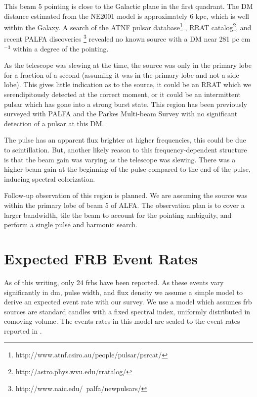 \documentclass[a4paper,fleqn,usenatbib]{mnras}
\begin{document}
This beam 5 pointing is close to the Galactic plane in the first quadrant. The
DM distance estimated from the NE2001 model \citep{2002astro.ph..7156C} is
approximately 6 kpc, which is well within the Galaxy. A search of the ATNF
pulsar database\footnote{http://www.atnf.csiro.au/people/pulsar/psrcat/}
\citep{2005AJ....129.1993M}, RRAT
catalog\footnote{http://astro.phys.wvu.edu/rratalog/}, and recent PALFA
discoveries \footnote{http://www.naic.edu/~palfa/newpulsars/} revealed no known
source with a DM near 281 pc cm$^{-3}$ within a degree of the pointing.

As the telescope was slewing at the time, the source was only in the primary
lobe for a fraction of a second (assuming it was in the primary lobe and not a
side lobe). This gives little indication as to the source, it could be an RRAT
which we serendipitously detected at the correct moment, or it could be an
intermittent pulsar which has gone into a strong burst state. This region has
been previously surveyed with PALFA and the Parkes Multi-beam Survey
\citep{2001MNRAS.328...17M} with no significant detection of a pulsar at this
DM.

The pulse has an apparent flux brighter at higher frequencies, this could be due
to scintillation. But, another likely reason to this frequency-dependent
structure is that the beam gain was varying as the telescope was slewing. There
was a higher beam gain at the beginning of the pulse compared to the end of the
pulse, inducing spectral colorization.

Follow-up observation of this region is planned. We are assuming the source was
within the primary lobe of beam 5 of ALFA. The observation plan is to cover a
larger bandwidth, tile the beam to account for the pointing ambiguity, and
perform a single pulse and harmonic search.



\section{Expected FRB Event Rates}
\label{sec:event_rates}

As of this writing, only 24 \glspl{frb} have been reported. As these events vary
significantly in \gls{dm}, pulse width, and flux density we assume a simple
model to derive an expected event rate with our survey.  We use a model
\citep{2013MNRAS.436L...5L} which assumes \gls{frb} sources are standard candles
with a fixed spectral index, uniformly distributed in comoving volume. The
events rates in this model are scaled to the event rates reported in
\cite{2013Sci...341...53T}.
\end{document}
